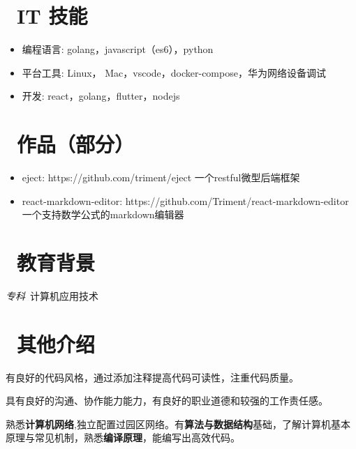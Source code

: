 \documentclass{resume}
\begin{document}
\section{\faCogs\ IT 技能}
\begin{itemize}[parsep=0.5ex]
  \item 编程语言: golang，javascript（es6），python
  \item 平台工具: Linux， Mac，vscode，docker-compose，华为网络设备调试
  \item 开发: react，golang，flutter，nodejs
\end{itemize}

\section{\faGithub\ 作品（部分）}
\begin{itemize}[parsep=0.5ex]
  \item eject: https://github.com/triment/eject 一个restful微型后端框架~
  \item react-markdown-editor: https://github.com/Triment/react-markdown-editor 一个支持数学公式的markdown编辑器~
\end{itemize}

\section{\faGraduationCap\  教育背景}
\textit{专科}\ 计算机应用技术

\section{\faSunO\ 其他介绍}
有良好的代码风格，通过添加注释提高代码可读性，注重代码质量。

具有良好的沟通、协作能力能力，有良好的职业道德和较强的工作责任感。

熟悉\textbf{计算机网络},独立配置过园区网络。有\textbf{算法与数据结构}基础，了解计算机基本原理与常见机制，熟悉\textbf{编译原理}，能编写出高效代码。
%
%
\end{document}
